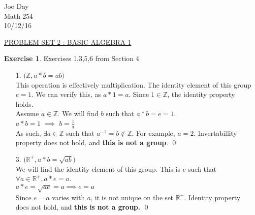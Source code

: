 \documentclass[12pt]{article}
\theoremstyle{definition}
\newtheorem{exercise}[theorem]{Exercise}
\newcommand{\Z}{\mathbb{Z}}
\newcommand{\R}{\mathbb R}
\newcommand{\V}{\vspace{0.3cm}\\}
\begin{document}
\begin{flushright}
Joe Day\\
Math 254\\
10/12/16
\end{flushright}
\begin{center}
\underline{PROBLEM SET 2 : BASIC ALGEBRA 1}
\end{center}

\begin{exercise} Exercises 1,3,5,6 from Section 4
\begin{enumerate}
\item[1.] $\big(\Z, a * b = ab \big)$ \V
This operation is effectively multiplication. The identity element of this group $e =1$. We can verify this, as $a*1 =a$. Since $1 \in \Z$, the identity property holds. \V
Assume $a \in \Z$. We will find $b$ such that $a*b=e=1$.\\ 
$a*b=1$ $\implies$ $b = \frac{1}{a}$\\
As such, $\exists a \in \Z$ such that $a^{-1} = b \not \in \Z$. For example, $a=2$.  Invertabillity property does not hold, and \textbf{this is not a group}. \qed
\item[3.] $\big(\R^+, a * b = \sqrt{ab} \big)$ \V
We will find the identity element of this group. This is $e$ such that $\forall a \in \R^+, a*e=a$. \\
$a*e=\sqrt{ae}=a \implies e = a$\V
Since $e=a$ varies with $a$, it is not unique on the set $\R^+$. Identity property does not hold, and \textbf{this is not a group.} \qed


\end{enumerate}
\end{exercise}
\end{document}
